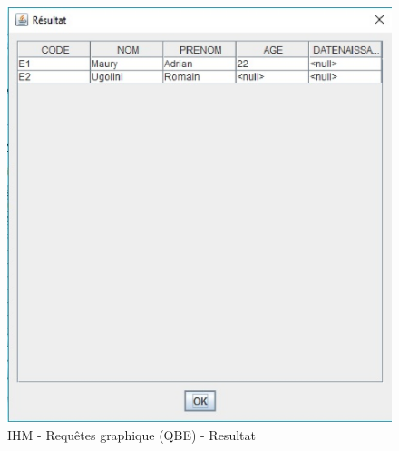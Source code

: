 \begin{figure}[!h]
\centering
\includegraphics[width=12cm]{./images/manuel/qbe_result.eps}
\caption{IHM - Requêtes graphique (QBE) - Resultat}
\label{qbe_result_gui}
\end{figure}